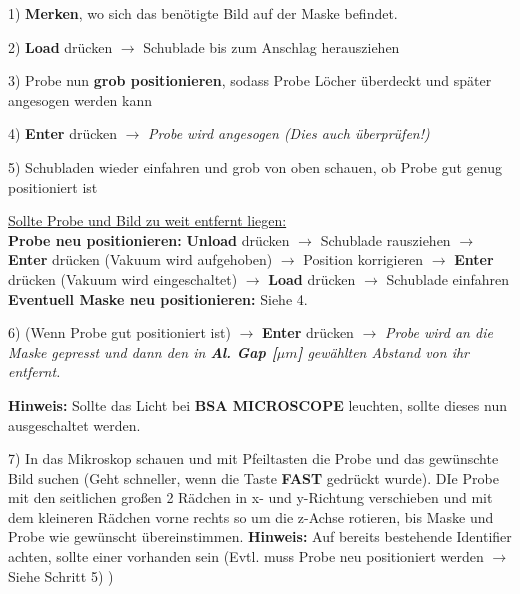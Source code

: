 \documentclass[12pt,a4paper]{article}
\begin{document}
\begin{description}
\item 1) \textbf{Merken}, wo sich das benötigte Bild auf der Maske befindet.

\item 2) \textbf{Load} drücken $\rightarrow$ Schublade bis zum Anschlag herausziehen

\item 3) Probe nun \textbf{grob positionieren}, sodass Probe Löcher überdeckt und später angesogen werden kann

\item 4) \textbf{Enter} drücken $\rightarrow$ \textit{Probe wird angesogen (Dies auch überprüfen!)}

\item 5) Schubladen wieder einfahren und grob von oben schauen, ob Probe gut genug positioniert ist\newline

\underline{Sollte Probe und Bild zu weit entfernt liegen:}\\ 
\textbf{Probe neu positionieren:} \textbf{Unload} drücken $\rightarrow$ Schublade rausziehen $\rightarrow$ \textbf{Enter} drücken (Vakuum wird aufgehoben) $\rightarrow$ Position korrigieren $\rightarrow$ \textbf{Enter} drücken (Vakuum wird eingeschaltet) $\rightarrow$ \textbf{Load} drücken $\rightarrow$ Schublade einfahren\\
\textbf{Eventuell Maske neu positionieren:} Siehe 4.

\item 6) (Wenn Probe gut positioniert ist) $\rightarrow$ \textbf{Enter} drücken \newline 
$\rightarrow$ \textit{Probe wird an die Maske gepresst und dann den in \textbf{Al. Gap [$\mu m$]} gewählten Abstand von ihr entfernt.}

\textbf{Hinweis:} Sollte das Licht bei \textbf{BSA MICROSCOPE} leuchten,  sollte dieses nun ausgeschaltet werden.

\item 7) In das Mikroskop schauen und mit Pfeiltasten die Probe und das gewünschte Bild suchen (Geht schneller, wenn die Taste \textbf{FAST} gedrückt wurde). DIe Probe mit den seitlichen großen 2 Rädchen in x- und y-Richtung verschieben und mit dem kleineren Rädchen vorne rechts so um die z-Achse rotieren, bis Maske und Probe wie gewünscht übereinstimmen.\newline
\textbf{Hinweis:} Auf bereits bestehende Identifier achten, sollte einer vorhanden sein (Evtl. muss Probe neu positioniert werden $\rightarrow$ Siehe Schritt 5) )


\end{description}
\end{document}
